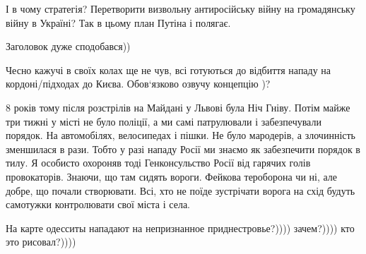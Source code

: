 \begin{itemize}

І в чому стратегія? Перетворити визвольну антиросійську війну на громадянську
війну в Україні? Так в цьому план Путіна і полягає.


Заголовок дуже сподобався))

Чесно кажучі в своїх колах ще не чув, всі готуються до відбиття нападу на
кордоні/підходах до Києва. Обов‘язково озвучу концепцію )?


8 років тому після розстрілів на Майдані у Львові була Ніч Гніву. Потім майже
три тижні у місті не було поліції, а ми самі патрулювали і забезпечували
порядок. На автомобілях, велосипедах і пішки. Не було мародерів, а злочинність
зменшилася в рази. Тобто у разі нападу Росії ми знаємо як забезпечити порядок в
тилу. Я особисто охороняв тоді Генконсульство Росії від гарячих голів
провокаторів. Знаючи, що там сидять вороги. Фейкова тероборона чи ні, але
добре, що почали створювати. Всі, хто не поїде зустрічати ворога на схід будуть
самотужки контролювати свої міста і села.


На карте одесситы нападают на непризнанное приднестровье?)))) зачем?)))) кто
это рисовал?))))

\end{itemize} %
